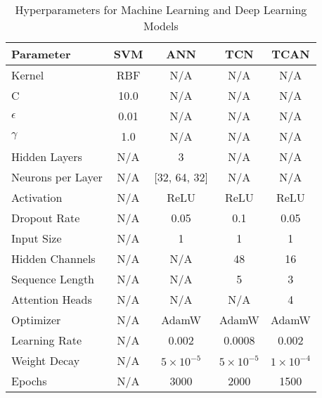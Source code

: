 \begin{table*}[ht]
\centering
\caption{Hyperparameters for Machine Learning and Deep Learning Models}
\vspace{0.5em}%
\label{tab:hyperparameters}
\begin{tabular}{|l|c|c|c|c|}
\hline
\textbf{Parameter} & \textbf{SVM} & \textbf{ANN} & \textbf{TCN} & \textbf{TCAN} \\
\hline
Kernel & RBF & N/A & N/A & N/A \\
C & 10.0 & N/A & N/A & N/A \\
$\epsilon$ & 0.01 & N/A & N/A & N/A \\
$\gamma$ & 1.0 & N/A & N/A & N/A \\
\hline
Hidden Layers & N/A & 3 & N/A & N/A \\
Neurons per Layer & N/A & [32, 64, 32] & N/A & N/A \\
Activation & N/A & ReLU & ReLU & ReLU \\
Dropout Rate & N/A & 0.05 & 0.1 & 0.05 \\
\hline
Input Size & N/A & 1 & 1 & 1 \\
Hidden Channels & N/A & N/A & 48 & 16 \\
Sequence Length & N/A & N/A & 5 & 3 \\
Attention Heads & N/A & N/A & N/A & 4 \\
\hline
Optimizer & N/A & AdamW & AdamW & AdamW \\
Learning Rate & N/A & 0.002 & 0.0008 & 0.002 \\
Weight Decay & N/A & $5 \times 10^{-5}$ & $5 \times 10^{-5}$ & $1 \times 10^{-4}$ \\
Epochs & N/A & 3000 & 2000 & 1500 \\
\hline
\end{tabular}
\end{table*}
